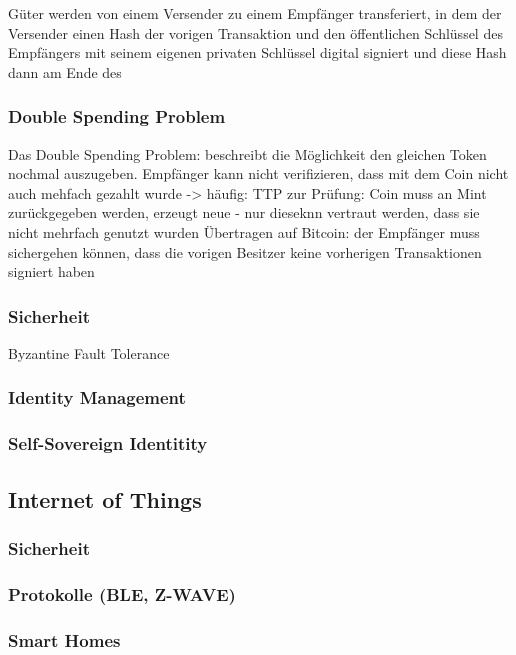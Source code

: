     Güter werden von einem Versender zu einem Empfänger transferiert, in dem der Versender einen Hash der vorigen Transaktion und den öffentlichen Schlüssel des Empfängers mit seinem eigenen privaten Schlüssel digital signiert und diese Hash dann am Ende des 
    
    
    \subsubsection{Double Spending Problem}
    Das Double Spending Problem: beschreibt die Möglichkeit den gleichen Token nochmal auszugeben\cite{Chohan2017}.
    Empfänger kann nicht verifizieren, dass mit dem Coin nicht auch mehfach gezahlt wurde -> häufig: TTP zur Prüfung: Coin muss an Mint zurückgegeben werden, erzeugt neue - nur dieseknn vertraut werden, dass sie nicht mehrfach genutzt wurden\cite{Nakamoto2008}
    Übertragen auf Bitcoin: der Empfänger muss sichergehen können, dass die vorigen Besitzer keine vorherigen Transaktionen signiert haben \cite{Nakamoto2008}
    
    \subsubsection{Sicherheit}
    Byzantine Fault Tolerance
    
    \subsubsection{Identity Management}
    \subsubsection{Self-Sovereign Identitity}

\subsection{Internet of Things}
    \subsubsection{Sicherheit}
    \subsubsection{Protokolle (BLE, Z-WAVE)}
    \subsubsection{Smart Homes}

